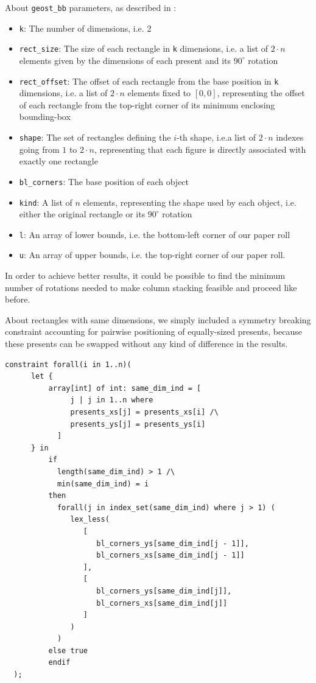 \documentclass[a4paper,10pt]{article}
\begin{document}
About \texttt{geost\_bb} parameters, as described in \cite{geost}:
\begin{itemize}
   \item \texttt{k}: The number of dimensions, i.e. 2
   \item \texttt{rect\_size}: The size of each rectangle in \texttt{k} dimensions, i.e. a list of $2\cdot n$ elements given by the dimensions of each present and its $90^{\circ}$ rotation
   \item \texttt{rect\_offset}: The offset of each rectangle from the base position in \texttt{k}  dimensions, i.e. a list of $2\cdot n$ elements fixed to $[0,0]$, representing the offset of each rectangle from the top-right corner of its minimum enclosing bounding-box
   \item \texttt{shape}: The set of rectangles defining the $i$-th shape, i.e.a list of $2\cdot n$ indexes going from $1$ to $2\cdot n$, representing that each figure is directly associated with exactly one rectangle
   \item \texttt{bl\_corners}: The base position of each object
   \item \texttt{kind}: A list of $n$ elements, representing the shape used by each object, i.e. either the original rectangle or its $90^{\circ}$ rotation
   \item \texttt{l}: An array of lower bounds, i.e. the bottom-left corner of our paper roll
   \item \texttt{u}: An array of upper bounds, i.e. the top-right corner of our paper roll.
\end{itemize}

In order to achieve better results, it could be possible to find the minimum number of rotations needed to make column stacking feasible and proceed like before.

About rectangles with same dimensions, we simply included a symmetry breaking constraint accounting for pairwise positioning of equally-sized presents, because these presents can be swapped without any kind of difference in the results.

\begin{Verbatim}[samepage=true]
   constraint forall(i in 1..n)(
      let {
          array[int] of int: same_dim_ind = [
               j | j in 1..n where
               presents_xs[j] = presents_xs[i] /\
               presents_ys[j] = presents_ys[i]
            ]
      } in
          if
            length(same_dim_ind) > 1 /\
            min(same_dim_ind) = i
          then
            forall(j in index_set(same_dim_ind) where j > 1) (
               lex_less(
                  [
                     bl_corners_ys[same_dim_ind[j - 1]],
                     bl_corners_xs[same_dim_ind[j - 1]]
                  ],
                  [
                     bl_corners_ys[same_dim_ind[j]],
                     bl_corners_xs[same_dim_ind[j]]
                  ]
               )
            )
          else true
          endif
  );
\end{Verbatim}
\end{document}
